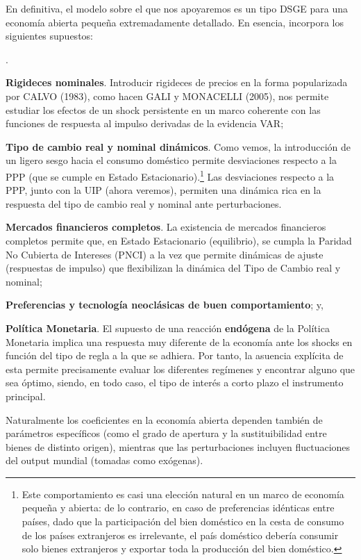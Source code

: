 \documentclass[10pt,a4paper]{article}
\newcounter{numitem}
\newenvironment{lnum}
      {\begin{list}{\arabic{numitem}.}{%
          \usecounter{numitem}%
          \setlength{\leftmargin}{1cm}%
          \setlength{\parskip}{3pt}%
          \setlength{\itemsep}{0pt}%
          \setlength{\parsep}{0pt}%
      }}
      {\end{list}}
\begin{document}
En definitiva, el modelo sobre el que nos apoyaremos es un tipo DSGE para una economía abierta pequeña extremadamente detallado. En esencia, incorpora los siguientes supuestos:
\begin{lnum}
    \item \textbf{Rigideces nominales}. Introducir rigideces de precios en la forma popularizada por CALVO (1983), como hacen GALI y MONACELLI (2005), nos permite estudiar los efectos de un shock persistente en un marco coherente con las funciones de respuesta al impulso derivadas de la evidencia VAR;
    \item \textbf{Tipo de cambio real y nominal dinámicos}. Como vemos, la introducción de un ligero sesgo hacia el consumo doméstico permite desviaciones respecto a la PPP (que se cumple en Estado Estacionario).\footnote{%
    Este comportamiento es casi una elección natural en un marco de economía pequeña y abierta: de lo contrario, en caso de preferencias idénticas entre países, dado que la participación del bien doméstico en la cesta de consumo de los países extranjeros es irrelevante, el país doméstico debería consumir solo bienes extranjeros y exportar toda la producción del bien doméstico.
    } Las desviaciones respecto a la PPP, junto con la UIP (ahora veremos), permiten una dinámica rica en la respuesta del tipo de cambio real y nominal ante perturbaciones.
    \item \textbf{Mercados financieros completos}. La existencia de mercados financieros completos permite que, en Estado Estacionario (equilibrio), se cumpla la Paridad No Cubierta de Intereses (PNCI) a la vez que permite dinámicas de ajuste (respuestas de impulso) que flexibilizan la dinámica del Tipo de Cambio real y nominal;
    \item \textbf{Preferencias y tecnología neoclásicas de buen comportamiento}; y,
    \item \textbf{Política Monetaria}. El supuesto de una reacción \textbf{endógena} de la Política Monetaria implica una respuesta muy diferente de la economía ante los shocks en función del tipo de regla a la que se adhiera. Por tanto, la asuencia explícita de esta permite precisamente evaluar los diferentes regímenes y encontrar alguno que sea óptimo, siendo, en todo caso, el tipo de interés a corto plazo el instrumento principal.
\end{lnum}

Naturalmente los coeficientes en la economía abierta dependen también de parámetros específicos (como el grado de apertura y la sustituibilidad entre bienes de distinto origen), mientras que las perturbaciones incluyen fluctuaciones del output mundial (tomadas como exógenas).
\end{document}
